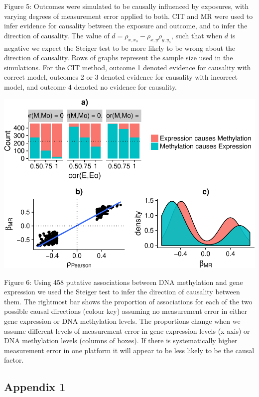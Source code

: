 \documentclass[]{article}
\begin{document}
Figure 5: Outcomes were simulated to be causally influenced by
exposures, with varying degrees of measurement error applied to both.
CIT and MR were used to infer evidence for causality between the
exposure and outcome, and to infer the direction of causality. The value
of \(d = \rho_{x, x_o} - \rho_{x,y}\rho_{y,y_o}\), such that when \(d\)
is negative we expect the Steiger test to be more likely to be wrong
about the direction of causality. Rows of graphs represent the sample
size used in the simulations. For the CIT method, outcome 1 denoted
evidence for causality with correct model, outcomes 2 or 3 denoted
evidence for causality with incorrect model, and outcome 4 denoted no
evidence for causality.

\newpage

\includegraphics{manuscript_files/figure-latex/shakhplot-1.pdf}

Figure 6: Using 458 putative associations between DNA methylation and
gene expression we used the Steiger test to infer the direction of
causality between them. The rightmost bar shows the proportion of
associations for each of the two possible causal directions (colour key)
assuming no measurement error in either gene expression or DNA
methylation levels. The proportions change when we assume different
levels of measurement error in gene expression levels (x-axis) or DNA
methylation levels (columns of boxes). If there is systematically higher
measurement error in one platform it will appear to be less likely to be
the causal factor.

\newpage

\subsection{Appendix 1}\label{appendix-1}
\end{document}
